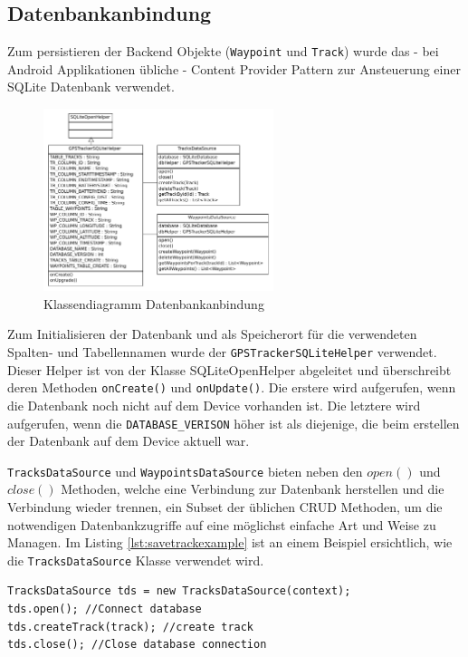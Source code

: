 \subsection{Datenbankanbindung}
\label{subsec:database}
Zum persistieren der Backend Objekte (\lstinline$Waypoint$ und \lstinline$Track$) wurde das - bei Android Applikationen übliche - Content Provider Pattern \cite{contentprovider} zur Ansteuerung einer SQLite Datenbank verwendet. 

\begin{figure}[h]
  \centering
  \includegraphics[width=0.6\textwidth]{images/classdiag_database.pdf}
  \caption[Klassendiagramm Datenbankanbindung]{Klassendiagramm Datenbankanbindung}
  \label{fig:classdiag_database}
\end{figure}

Zum Initialisieren der Datenbank und als Speicherort für die verwendeten Spalten- und Tabellennamen wurde der \lstinline$GPSTrackerSQLiteHelper$ verwendet. Dieser Helper ist von der Klasse SQLiteOpenHelper abgeleitet und überschreibt deren Methoden \lstinline$onCreate()$ und \lstinline$onUpdate()$. Die erstere wird aufgerufen, wenn die Datenbank noch nicht auf dem Device vorhanden ist. Die letztere wird aufgerufen, wenn die \lstinline$DATABASE_VERISON$ höher ist als diejenige, die beim erstellen der Datenbank auf dem Device aktuell war.

\lstinline$TracksDataSource$ und \lstinline$WaypointsDataSource$ bieten neben den $open()$ und $close()$ Methoden, welche eine Verbindung zur Datenbank herstellen und die Verbindung wieder trennen, ein Subset der üblichen CRUD \cite{crud} Methoden, um die notwendigen Datenbankzugriffe auf eine möglichst einfache Art und Weise zu Managen. Im Listing \ref{lst:savetrackexample} ist an einem Beispiel ersichtlich, wie die \lstinline$TracksDataSource$ Klasse verwendet wird.

\begin{lstlisting}[caption={Beispiel: Track speichern}, label={lst:savetrackexample}]
TracksDataSource tds = new TracksDataSource(context);
tds.open(); //Connect database
tds.createTrack(track); //create track 
tds.close(); //Close database connection
\end{lstlisting}

